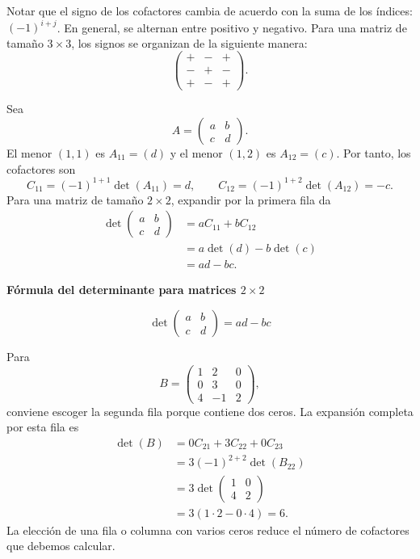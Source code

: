 \documentclass[compacto,10pt]{pubciencias-notas}
\begin{document}
\begin{obs}
    Notar que el signo de los cofactores cambia de acuerdo con la suma de los índices: $(-1)^{i+j}$. En general, se alternan entre positivo y negativo. Para una matriz de tamaño $3\times3$, los signos se organizan de la siguiente manera:
    \[
        \begin{pmatrix}
            +&-&+\\
            -&+&-\\
            +&-&+
        \end{pmatrix}.
    \]
\end{obs}
\begin{ejem}
    Sea
    \[
        A=\begin{pmatrix}a&b\\c&d\end{pmatrix}.
    \]
    El menor $(1,1)$ es $A_{11}=(d)$ y el menor $(1,2)$ es $A_{12}=(c)$. Por
    tanto, los cofactores son
    \[
        C_{11}=(-1)^{1+1}\det(A_{11})=d,
        \qquad
        C_{12}=(-1)^{1+2}\det(A_{12})=-c.
    \]
Para una matriz de tamaño $2\times2$, expandir por la primera fila da
\begin{align*}
    \det\begin{pmatrix}a&b\\c&d\end{pmatrix}
    &=aC_{11}+bC_{12}\\
    &=a\det(d)-b\det(c)\\
    &=ad-bc.
\end{align*}
\end{ejem}
\begin{advertencia}
    \textbf{Fórmula del determinante para matrices \(2\times2\)}
    
    \[\det\begin{pmatrix}a&b\\c&d\end{pmatrix}=ad-bc\]
\end{advertencia}

\begin{ejem}
    Para
    \[
        B=\begin{pmatrix}1&2&0\\0&3&0\\4&-1&2\end{pmatrix},
    \]
    conviene escoger la segunda fila porque contiene dos ceros. La expansión
    completa por esta fila es
    \begin{align*}
        \det(B)
        &=0C_{21}+3C_{22}+0C_{23}\\
        &=3(-1)^{2+2}\det(B_{22})\\
        &=3\det\begin{pmatrix}1&0\\4&2\end{pmatrix}\\
        &=3(1\cdot2-0\cdot4)=6.
    \end{align*}
    La elección de una fila o columna con varios ceros reduce el número de
    cofactores que debemos calcular.
\end{ejem}
\end{document}
